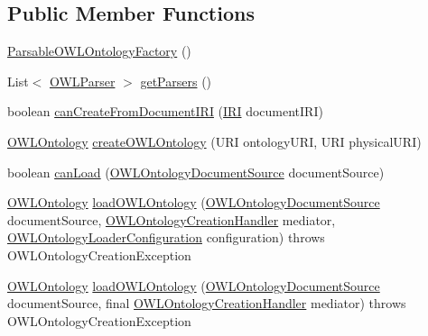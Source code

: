 \subsection*{Public Member Functions}
\begin{DoxyCompactItemize}
\item 
\hyperlink{classuk_1_1ac_1_1manchester_1_1cs_1_1owl_1_1owlapi_1_1_parsable_o_w_l_ontology_factory_a1b6cb63f0246e62c10cce48e0772188f}{Parsable\-O\-W\-L\-Ontology\-Factory} ()
\item 
List$<$ \hyperlink{interfaceorg_1_1semanticweb_1_1owlapi_1_1io_1_1_o_w_l_parser}{O\-W\-L\-Parser} $>$ \hyperlink{classuk_1_1ac_1_1manchester_1_1cs_1_1owl_1_1owlapi_1_1_parsable_o_w_l_ontology_factory_a06606b56f41b2a9fd10b14336e29a4d8}{get\-Parsers} ()
\item 
boolean \hyperlink{classuk_1_1ac_1_1manchester_1_1cs_1_1owl_1_1owlapi_1_1_parsable_o_w_l_ontology_factory_a8f13c82e75460b9ad820aacb8768d405}{can\-Create\-From\-Document\-I\-R\-I} (\hyperlink{classorg_1_1semanticweb_1_1owlapi_1_1model_1_1_i_r_i}{I\-R\-I} document\-I\-R\-I)
\item 
\hyperlink{interfaceorg_1_1semanticweb_1_1owlapi_1_1model_1_1_o_w_l_ontology}{O\-W\-L\-Ontology} \hyperlink{classuk_1_1ac_1_1manchester_1_1cs_1_1owl_1_1owlapi_1_1_parsable_o_w_l_ontology_factory_a293bfe6a881e13f65b910fac5ebf0622}{create\-O\-W\-L\-Ontology} (U\-R\-I ontology\-U\-R\-I, U\-R\-I physical\-U\-R\-I)
\item 
boolean \hyperlink{classuk_1_1ac_1_1manchester_1_1cs_1_1owl_1_1owlapi_1_1_parsable_o_w_l_ontology_factory_a08345d050d59ab70c6fe76381746aa0c}{can\-Load} (\hyperlink{interfaceorg_1_1semanticweb_1_1owlapi_1_1io_1_1_o_w_l_ontology_document_source}{O\-W\-L\-Ontology\-Document\-Source} document\-Source)
\item 
\hyperlink{interfaceorg_1_1semanticweb_1_1owlapi_1_1model_1_1_o_w_l_ontology}{O\-W\-L\-Ontology} \hyperlink{classuk_1_1ac_1_1manchester_1_1cs_1_1owl_1_1owlapi_1_1_parsable_o_w_l_ontology_factory_a6508dad6dc9e8fa6df4364e08228dcef}{load\-O\-W\-L\-Ontology} (\hyperlink{interfaceorg_1_1semanticweb_1_1owlapi_1_1io_1_1_o_w_l_ontology_document_source}{O\-W\-L\-Ontology\-Document\-Source} document\-Source, \hyperlink{interfaceorg_1_1semanticweb_1_1owlapi_1_1model_1_1_o_w_l_ontology_factory_1_1_o_w_l_ontology_creation_handler}{O\-W\-L\-Ontology\-Creation\-Handler} mediator, \hyperlink{classorg_1_1semanticweb_1_1owlapi_1_1model_1_1_o_w_l_ontology_loader_configuration}{O\-W\-L\-Ontology\-Loader\-Configuration} configuration)  throws O\-W\-L\-Ontology\-Creation\-Exception 
\item 
\hyperlink{interfaceorg_1_1semanticweb_1_1owlapi_1_1model_1_1_o_w_l_ontology}{O\-W\-L\-Ontology} \hyperlink{classuk_1_1ac_1_1manchester_1_1cs_1_1owl_1_1owlapi_1_1_parsable_o_w_l_ontology_factory_a6b6d299af5d84f621639fb26a5582e92}{load\-O\-W\-L\-Ontology} (\hyperlink{interfaceorg_1_1semanticweb_1_1owlapi_1_1io_1_1_o_w_l_ontology_document_source}{O\-W\-L\-Ontology\-Document\-Source} document\-Source, final \hyperlink{interfaceorg_1_1semanticweb_1_1owlapi_1_1model_1_1_o_w_l_ontology_factory_1_1_o_w_l_ontology_creation_handler}{O\-W\-L\-Ontology\-Creation\-Handler} mediator)  throws O\-W\-L\-Ontology\-Creation\-Exception 
\end{DoxyCompactItemize}
